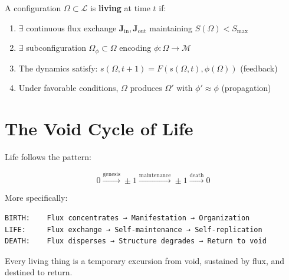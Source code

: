 \documentclass[
  11pt,
  letterpaper,
  twoside,
  openright]{book}
\begin{document}
\begin{tcolorbox}[enhanced jigsaw, coltitle=black, colbacktitle=quarto-callout-important-color!10!white, toprule=.15mm, colframe=quarto-callout-important-color-frame, arc=.35mm, opacityback=0, bottomtitle=1mm, toptitle=1mm, breakable, colback=white, titlerule=0mm, opacitybacktitle=0.6, title=\textcolor{quarto-callout-important-color}{\faExclamation}\hspace{0.5em}{Definition (Formal)}, rightrule=.15mm, bottomrule=.15mm, leftrule=.75mm, left=2mm]

A configuration \(\Omega \subset \mathcal{L}\) is \textbf{living} at
time \(t\) if:

\begin{enumerate}
\def\labelenumi{\arabic{enumi}.}
\item
  \(\exists\) continuous flux exchange
  \(\mathbf{J}_{\text{in}}, \mathbf{J}_{\text{out}}\) maintaining
  \(S(\Omega) < S_{\text{max}}\)
\item
  \(\exists\) subconfiguration \(\Omega_\phi \subset \Omega\) encoding
  \(\phi: \Omega \to \mathcal{M}\)
\item
  The dynamics satisfy:
  \(s(\Omega, t+1) = F(s(\Omega, t), \phi(\Omega))\) (feedback)
\item
  Under favorable conditions, \(\Omega\) produces \(\Omega'\) with
  \(\phi' \approx \phi\) (propagation)
\end{enumerate}

\end{tcolorbox}

\section{The Void Cycle of Life}\label{the-void-cycle-of-life}

Life follows the pattern:

\[0 \xrightarrow{\text{genesis}} \pm 1 \xrightarrow{\text{maintenance}} \pm 1 \xrightarrow{\text{death}} 0\]

More specifically:

\begin{verbatim}
BIRTH:    Flux concentrates → Manifestation → Organization
LIFE:     Flux exchange → Self-maintenance → Self-replication
DEATH:    Flux disperses → Structure degrades → Return to void
\end{verbatim}

Every living thing is a temporary excursion from void, sustained by
flux, and destined to return.
\end{document}
